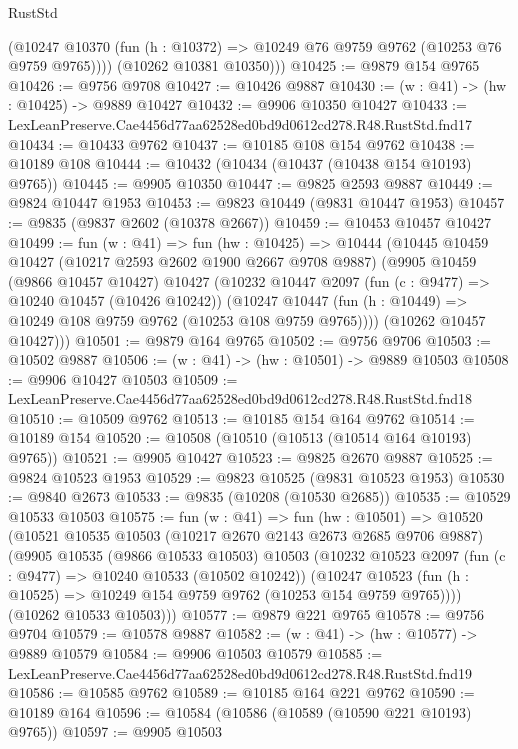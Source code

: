 \begin{lexlean}{RustStd}
\begin{coremodule}
          (@10247 @10370 (fun (h : @10372) => @10249 @76 @9759 @9762 (@10253 @76 @9759 @9765))))
        (@10262 @10381 @10350)))
@10425 := @9879 @154 @9765
@10426 := @9756 @9708
@10427 := @10426 @9887
@10430 := (w : @41) -> (hw : @10425) -> @9889 @10427
@10432 := @9906 @10350 @10427
@10433 := LexLeanPreserve.Cae4456d77aa62528ed0bd9d0612cd278.R48.RustStd.fnd17
@10434 := @10433 @9762
@10437 := @10185 @108 @154 @9762
@10438 := @10189 @108
@10444 := @10432 (@10434 (@10437 (@10438 @154 @10193) @9765))
@10445 := @9905 @10350
@10447 := @9825 @2593 @9887
@10449 := @9824 @10447 @1953
@10453 := @9823 @10449 (@9831 @10447 @1953)
@10457 := @9835 (@9837 @2602 (@10378 @2667))
@10459 := @10453 @10457 @10427
@10499 := fun (w : @41) =>
  fun (hw : @10425) =>
  @10444
    (@10445
      @10459
      @10427
      (@10217 @2593 @2602 @1900 @2667 @9708 @9887)
      (@9905
        @10459
        (@9866 @10457 @10427)
        @10427
        (@10232
          @10447
          @2097
          (fun (c : @9477) => @10240 @10457 (@10426 @10242))
          (@10247 @10447 (fun (h : @10449) => @10249 @108 @9759 @9762 (@10253 @108 @9759 @9765))))
        (@10262 @10457 @10427)))
@10501 := @9879 @164 @9765
@10502 := @9756 @9706
@10503 := @10502 @9887
@10506 := (w : @41) -> (hw : @10501) -> @9889 @10503
@10508 := @9906 @10427 @10503
@10509 := LexLeanPreserve.Cae4456d77aa62528ed0bd9d0612cd278.R48.RustStd.fnd18
@10510 := @10509 @9762
@10513 := @10185 @154 @164 @9762
@10514 := @10189 @154
@10520 := @10508 (@10510 (@10513 (@10514 @164 @10193) @9765))
@10521 := @9905 @10427
@10523 := @9825 @2670 @9887
@10525 := @9824 @10523 @1953
@10529 := @9823 @10525 (@9831 @10523 @1953)
@10530 := @9840 @2673
@10533 := @9835 (@10208 (@10530 @2685))
@10535 := @10529 @10533 @10503
@10575 := fun (w : @41) =>
  fun (hw : @10501) =>
  @10520
    (@10521
      @10535
      @10503
      (@10217 @2670 @2143 @2673 @2685 @9706 @9887)
      (@9905
        @10535
        (@9866 @10533 @10503)
        @10503
        (@10232
          @10523
          @2097
          (fun (c : @9477) => @10240 @10533 (@10502 @10242))
          (@10247 @10523 (fun (h : @10525) => @10249 @154 @9759 @9762 (@10253 @154 @9759 @9765))))
        (@10262 @10533 @10503)))
@10577 := @9879 @221 @9765
@10578 := @9756 @9704
@10579 := @10578 @9887
@10582 := (w : @41) -> (hw : @10577) -> @9889 @10579
@10584 := @9906 @10503 @10579
@10585 := LexLeanPreserve.Cae4456d77aa62528ed0bd9d0612cd278.R48.RustStd.fnd19
@10586 := @10585 @9762
@10589 := @10185 @164 @221 @9762
@10590 := @10189 @164
@10596 := @10584 (@10586 (@10589 (@10590 @221 @10193) @9765))
@10597 := @9905 @10503

\end{coremodule}
\end{lexlean}

